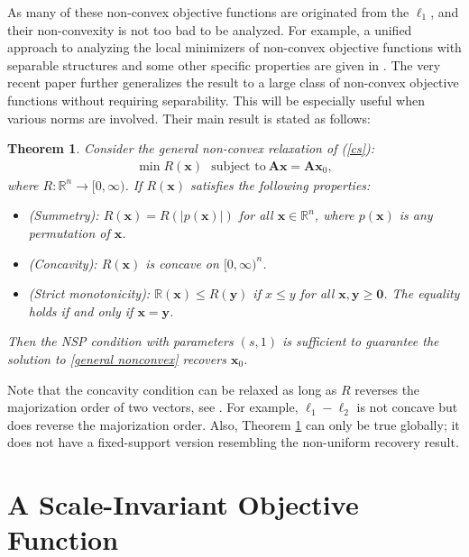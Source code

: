 \documentclass[11pt]{article}
\numberwithin{equation}{section}
\theoremstyle{plain}
\newtheorem{Th}{Theorem}[section]
\theoremstyle{definition}
\def\R{{\mathbb R}}
\def\R{{\mathbb R}}
\def\A{{\mathbf A}}
\def\x{{\mathbf x}}
\def\y{{\mathbf{y}}}
\begin{document}
As many of these non-convex objective functions are originated from the $\ell_1$, and their non-convexity is not too bad to be analyzed. For example, a unified approach to analyzing the local minimizers of non-convex objective functions with separable structures and some other specific properties are given in \cite{lv2009unified}. The very recent paper \cite{tran2017unified} further generalizes the result to a large class of non-convex objective functions without requiring separability. This will be especially useful when various norms are involved. Their main result is stated as follows:
\begin{Th}\label{general nonconxe Th}
Consider the general non-convex relaxation of (\ref{cs}):
\begin{align}
\min R(\x) \ \ \ \text{subject to}\ \A\x=\A\x_0,\label{general nonconvex}
\end{align}
where $R:\R^n\rightarrow [0, \infty)$. If $R(\x)$ satisfies the following properties:
\begin{itemize}
\item (Summetry): $R(\x)=R(|p(\x)|)$ for all $\x\in\R^n$, where $p(\x)$ is any permutation of $\x$. 
\item (Concavity): $R(\x)$ is concave on $[0,\infty)^n$.  
\item (Strict monotonicity): $\R(\x)\leq R(\y)$ if $x\leq y$ for all $\x, \y\geq \mathbf{0}$. The equality holds if and only if $\x=\y$.  
\end{itemize}
Then the NSP condition with parameters $(s,1)$ is sufficient to guarantee the solution to \ref{general nonconvex} recovers $\x_0$. 
\end{Th}
Note that the concavity condition can be relaxed as long as $R$ reverses the majorization order of two vectors, see \cite{tran2017unified}. For example, $\ell_1-\ell_2$ is not concave but does reverse the majorization order. Also, Theorem \ref{general nonconxe Th} can only be true globally; it does not have a fixed-support version resembling the non-uniform recovery result.  



    

\section{A Scale-Invariant Objective Function}
\end{document}
